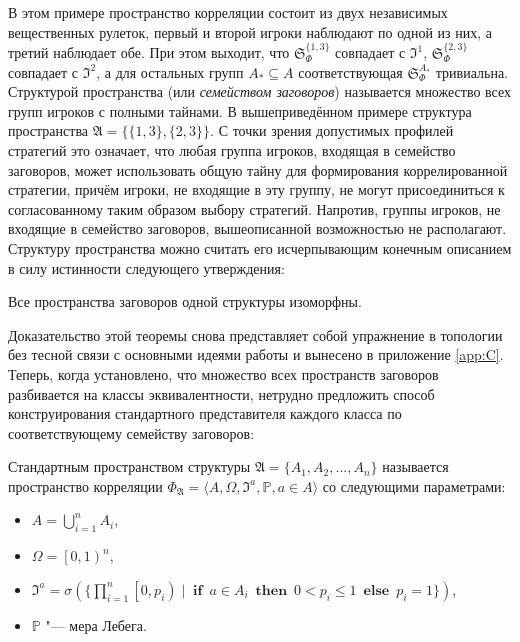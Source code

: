 В этом примере пространство корреляции состоит из двух независимых вещественных рулеток, первый и второй игроки наблюдают по одной из них, а третий наблюдает обе. При этом выходит, что $\mathfrak{S}_\Phi^{\{1,3\}}$ совпадает с $\mathfrak{I}^1$, $\mathfrak{S}_\Phi^{\{2,3\}}$ совпадает с $\mathfrak{I}^2$, а для остальных групп $A_* \subseteq A$ соответствующая $\mathfrak{S}_\Phi^{A_*}$ тривиальна. Структурой пространства (или \emph{семейством заговоров}) называется множество всех групп игроков с полными тайнами. В вышеприведённом примере структура пространства $\mathfrak{A} = \{\{1,3\},\{2,3\}\}$. С точки зрения допустимых профилей стратегий это означает, что любая группа игроков, входящая в семейство заговоров, может использовать общую тайну для формирования коррелированной стратегии, причём игроки, не входящие в эту группу, не могут присоединиться к согласованному таким образом выбору стратегий. Напротив, группы игроков, не входящие в семейство заговоров, вышеописанной возможностью не располагают. Структуру пространства можно считать его исчерпывающим конечным описанием в силу истинности следующего утверждения:
\begin{theorem} \label{the:struct}
	Все пространства заговоров одной структуры изоморфны.
\end{theorem}

Доказательство этой теоремы снова представляет собой упражнение в топологии без тесной связи с основными идеями работы и вынесено в приложение \ref{app:C}. Теперь, когда установлено, что множество всех пространств заговоров разбивается на классы эквивалентности, нетрудно предложить способ конструирования стандартного представителя каждого класса по соответствующему семейству заговоров:
\begin{definition}
	Стандартным пространством структуры $\mathfrak{A} = \{A_1, A_2, ..., A_n\}$ называется пространство корреляции $\Phi_{\mathfrak{A}} = \langle A, \Omega, \mathfrak{I}^a, \mathbb{P}, a \in A \rangle$ со следующими параметрами:
	\begin{itemize}
		\item $A = \bigcup\limits_{i=1}^n A_i$,
		\item $\Omega = \left[0, 1\right)^n$,
		\item $\mathfrak{I}^a = \sigma(\{\prod\limits_{i=1}^n\left[ 0, p_i \right) \mid \operatorname{\mathbf{if}} \: a \in A_i \: \operatorname{\mathbf{then}} \: 0 < p_i \leq 1 \: \operatorname{\mathbf{else}} \: p_i = 1 \})$,
		\item $\mathbb{P}$ "--- мера Лебега.
	\end{itemize}
\end{definition}

